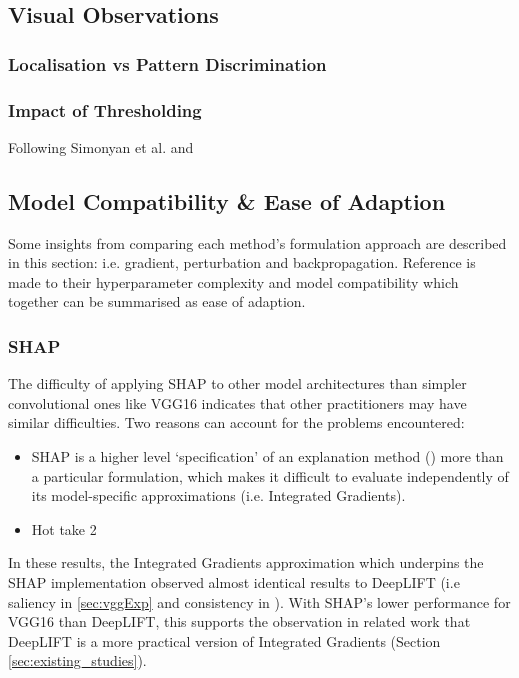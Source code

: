 \documentclass[main]{subfiles}
\begin{document}
\newpage
\subsection{Visual Observations}

\subsubsection{Localisation vs Pattern Discrimination}



\subsubsection{Impact of Thresholding}
Following Simonyan et al. and 

\newpage
\subsection{Model Compatibility \& Ease of Adaption} \label{sec:compatibility}
Some insights from comparing each method's formulation approach are described in this section: i.e. gradient, perturbation and backpropagation. Reference is made to their hyperparameter complexity and model compatibility which together can be summarised as ease of adaption.
\subsubsection{SHAP}
The difficulty of applying SHAP to other model architectures than simpler convolutional ones like VGG16 indicates that other practitioners may have similar difficulties. Two reasons can account for the problems encountered:

\begin{itemize}
\item SHAP is a higher level `specification' of an explanation method (\label{sec:othermodelag}) more than a particular formulation, which makes it difficult to evaluate independently of its model-specific approximations (i.e. Integrated Gradients). 
\item Hot take 2
\end{itemize}

In these results, the Integrated Gradients approximation which underpins the SHAP implementation observed almost identical results to DeepLIFT (i.e saliency in \ref{sec:vggExp} and consistency in ). With SHAP's lower performance for VGG16 than DeepLIFT, this supports the observation in related work that DeepLIFT is a more practical version of Integrated Gradients (Section \ref{sec:existing_studies}).
\end{document}
